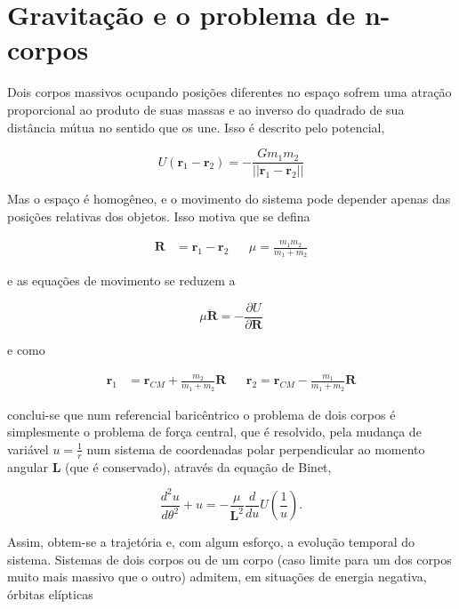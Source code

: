 \section{Gravitação e o problema de n-corpos}

Dois corpos massivos ocupando posições diferentes no espaço sofrem uma atração proporcional ao produto de suas massas e ao inverso do quadrado de sua distância mútua no sentido que os une. Isso é descrito pelo potencial,

\begin{equation}
    \label{eq:gravitacaouniversal}
    U(\mathbf{r}_1 - \mathbf{r}_2) = -\frac{Gm_1m_2}{||\mathbf{r}_1 - \mathbf{r}_2||}
\end{equation}

Mas o espaço é homogêneo, e o movimento do sistema pode depender apenas das posições relativas dos objetos. Isso motiva que se defina

\begin{align}
    \mathbf{R} &= \mathbf{r}_1 - \mathbf{r}_2 && \mu = \frac{m_1m_2}{m_1 + m_2}
\end{align}

e as equações de movimento se reduzem a

\begin{equation}
    \mu \ddot{\mathbf{R}} = -\frac{\partial U}{\partial \mathbf{R}}
\end{equation}

e como

\begin{align}
    \mathbf{r}_1 &= \mathbf{r}_{CM} + \frac{m_2}{m_1 + m_2}\mathbf{R} && \mathbf{r}_2 = \mathbf{r}_{CM} - \frac{m_1}{m_1 + m_2}\mathbf{R}
\end{align}

conclui-se que num referencial baricêntrico o problema de dois corpos é simplesmente o problema de força central, que é resolvido, pela mudança de variável $u = \frac{1}{r}$ num sistema de coordenadas polar perpendicular ao momento angular $\mathbf{L}$ (que é conservado), através da equação de Binet,

\begin{equation}
    \label{eq:binet}
    \frac{d^2u}{d\theta^2} + u = -\frac{\mu}{\mathbf{L}^2}\frac{d}{du}U\left(\frac{1}{u}\right).
\end{equation}

Assim, obtem-se a trajetória e, com algum esforço, a evolução temporal do sistema. Sistemas de dois corpos ou de um corpo (caso limite para um dos corpos muito mais massivo que o outro) admitem, em situações de energia negativa, órbitas elípticas

